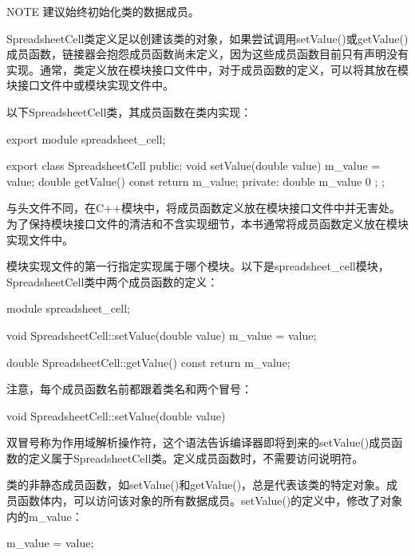 \begin{myNotic}{NOTE}
建议始终初始化类的数据成员。
\end{myNotic}


SpreadsheetCell类定义足以创建该类的对象，如果尝试调用setValue()或getValue()成员函数，链接器会抱怨成员函数尚未定义，因为这些成员函数目前只有声明没有实现。通常，类定义放在模块接口文件中，对于成员函数的定义，可以将其放在模块接口文件中或模块实现文件中。

以下SpreadsheetCell类，其成员函数在类内实现：

\begin{cpp}
export module spreadsheet_cell;

export class SpreadsheetCell
{
    public:
        void setValue(double value) { m_value = value; }
        double getValue() const { return m_value; }
    private:
        double m_value { 0 };
};
\end{cpp}

与头文件不同，在C++模块中，将成员函数定义放在模块接口文件中并无害处。为了保持模块接口文件的清洁和不含实现细节，本书通常将成员函数定义放在模块实现文件中。

模块实现文件的第一行指定实现属于哪个模块。以下是spreadsheet\_cell模块，SpreadsheetCell类中两个成员函数的定义：

\begin{cpp}
module spreadsheet_cell;

void SpreadsheetCell::setValue(double value)
{
    m_value = value;
}

double SpreadsheetCell::getValue() const
{
    return m_value;
}

\end{cpp}

注意，每个成员函数名前都跟着类名和两个冒号：

\begin{cpp}
void SpreadsheetCell::setValue(double value)
\end{cpp}

双冒号称为作用域解析操作符，这个语法告诉编译器即将到来的setValue()成员函数的定义属于SpreadsheetCell类。定义成员函数时，不需要访问说明符。


类的非静态成员函数，如setValue()和getValue()，总是代表该类的特定对象。成员函数体内，可以访问该对象的所有数据成员。setValue()的定义中，修改了对象内的m\_value：

\begin{cpp}
m_value = value;
\end{cpp}

